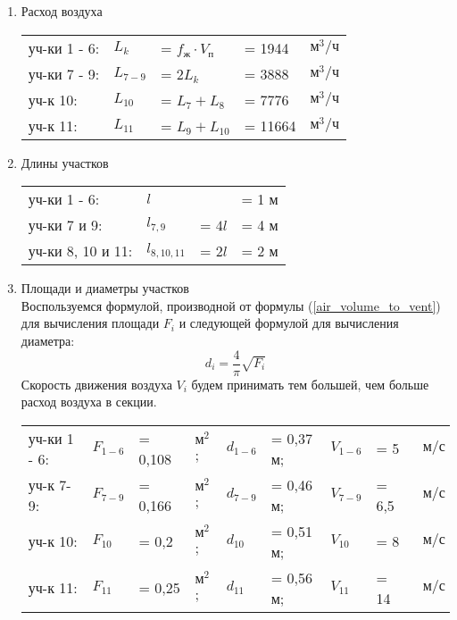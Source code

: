 \begin{enumerate}
    \item   Расход воздуха \\
            \begin{tabular}{lllll}
                уч-ки 1 - 6:    & $L_k $    & = $f_\text{ж} \cdot V_\text{п}$   & = 1944    & $\text{м}^3 / \text{ч}$ \\
                уч-ки 7 - 9:    & $L_{7-9}$ & = $2 L_k$                         & = 3888    & $\text{м}^3 / \text{ч}$ \\
                уч-к 10:        & $L_{10}$  & = $L_{7} + L_{8}$                 & = 7776    & $\text{м}^3 / \text{ч}$ \\
                уч-к 11:        & $L_{11}$  & = $L_{9} + L_{10}$                & = 11664   & $\text{м}^3 / \text{ч}$ \\
            \end{tabular}

    \item   Длины участков \\
            \begin{tabular}{llll}
                уч-ки 1 - 6:        & $l$           &           & = 1 м \\
                уч-ки 7 и 9:        & $l_{7,9}$     & = $4 l$   & = 4 м \\
                уч-ки 8, 10 и 11:   & $l_{8,10,11}$ & = $2 l$   & = 2 м \\
            \end{tabular}

    \item   Площади и диаметры участков \\
            Воспользуемся формулой, производной от формулы (\ref{air_volume_to_vent})
            для вычисления площади $F_i$ и следующей формулой для вычисления диаметра:
            \begin{equation}
            \label{vent_section_d}
                d_i = \frac{4}{\pi} \sqrt{F_i}
            \end{equation}
            Скорость движения воздуха $V_i$ будем принимать тем большей, чем больше
            расход воздуха в секции.
            \begin{tabular}{lllllllll}
                уч-ки 1 - 6:    & $F_{1-6}$ & = 0,108   & $\text{м}^2$; & $d_{1-6}$ & = 0,37 м; & $V_{1-6}$ & = 5   & $\text{ м/с}$     \\
                уч-к 7-9:       & $F_{7-9}$ & = 0,166   & $\text{м}^2$; & $d_{7-9}$ & = 0,46 м; & $V_{7-9}$   & = 6,5 & $\text{ м/с}$   \\
                уч-к 10:        & $F_{10}$  & = 0,2     & $\text{м}^2$; & $d_{10}$  & = 0,51 м; & $V_{10}$  & = 8   & $\text{ м/с}$     \\
                уч-к 11:        & $F_{11}$  & = 0,25    & $\text{м}^2$; & $d_{11}$  & = 0,56 м; & $V_{11}$  & = 14  & $\text{ м/с}$     \\
            \end{tabular}


\end{enumerate}
